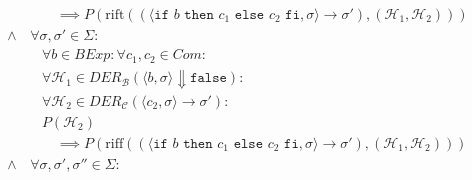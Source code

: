 \begin{align*}
																		                  & \quad\quad \implies P(\text{rift}((\langle \texttt{if } b \texttt{ then } c _ 1 \texttt{ else } c _ 2 \texttt{ fi}, \sigma \rangle \rightarrow \sigma'), (\mathcal{H} _ 1, \mathcal{H} _ 2))) \tag{Konklusion}                                            \\
																		\land             & \,\forall \sigma, \sigma' \in \Sigma : \tag{Zustände}                                                                                                                                                                                                     \\
																		                  & \quad \forall b \in \textit{BExp} : \forall c _ 1, c _ 2 \in \textit{Com} : \tag{Ausdrucksbestandteile}                                                                                                                                                   \\
																		                  & \quad \forall \mathcal{H} _ 1 \in \textit{DER} _ \mathcal{B} (\langle b, \sigma \rangle \Downarrow \texttt{false}) : \tag{Kalkülfremde Herleitungen}                                                                                                      \\
																		                  & \quad \forall \mathcal{H} _ 2 \in \textit{DER} _ \mathcal{C} (\langle c _ 2, \sigma \rangle \rightarrow \sigma') : \tag{Herleitungen in Prämisse}                                                                                                         \\
																		                  & \quad P(\mathcal{H} _ 2) \tag{Prämisse}                                                                                                                                                                                                                   \\
																		                  & \quad\quad \implies P(\text{riff}((\langle \texttt{if } b \texttt{ then } c _ 1 \texttt{ else } c _ 2 \texttt{ fi}, \sigma \rangle \rightarrow \sigma'), (\mathcal{H} _ 1, \mathcal{H} _ 2))) \tag{Konklusion}                                            \\
																		\land             & \,\forall \sigma, \sigma', \sigma'' \in \Sigma : \tag{Zustände}                                                                                                                                                                                           \\

\end{align*}
